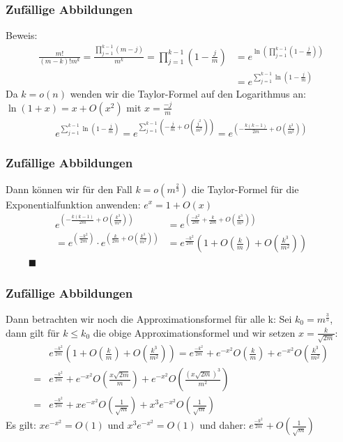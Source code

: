 \documentclass{beamer}
\begin{document}

\begin{frame}
	\frametitle{Zufällige Abbildungen}
	Beweis:
	\begin{align*}
		\frac{m!}{(m-k)!m^k} = \frac{\prod\limits_{j=1}^{k-1}(m-j)}{m^k} = \prod_{j=1}^{k-1} \left(1 - \frac{j}{m}\right)
		&= e^{\ln{\left( \prod_{j=1}^{k-1} \left(1 - \frac{j}{m} \right) \right)}} \\
		&= e^{ \sum_{j=1}^{k-1} \ln{\left(1 - \frac{j}{m} \right)}}
	\end{align*}
	Da \(k=o(n)\) wenden wir die Taylor-Formel auf den Logarithmus an:
	\(\ln{(1+x)} = x + O(x^2)\) mit \(x=\frac{-j}{m}\)
	\begin{align*}
		e^{ \sum_{j=1}^{k-1} \ln{\left(1 - \frac{j}{m} \right)}}
		= e^{\sum_{j=1}^{k-1} \left(-\frac{j}{m} + O\left(\frac{j^2}{m^2}\right)\right)}
		= e^{\left(-\frac{k(k-1)}{2m} + O\left(\frac{k^3}{m^2}\right)\right)}
	\end{align*}
\end{frame}


\begin{frame}
	\frametitle{Zufällige Abbildungen}
	Dann können wir für den Fall \(k=o\left(m^{\frac{2}{3}}\right)\) die Taylor-Formel für die Exponentialfunktion anwenden:
	\(e^x = 1 + O(x) \)
	\begin{align*}
		e^{\left(-\frac{k(k-1)}{2m} + O\left(\frac{k^3}{m^2}\right)\right)}
		&= e^{\left(\frac{-k^2}{2m} + \frac{k}{2m} + O\left(\frac{k^3}{m^2}\right)\right)} \\
		= e^{\left(\frac{-k^2}{2m}\right)} \cdot e^{\left(\frac{k}{2m} + O\left(\frac{k^3}{m^2}\right)\right)}
		&= e^\frac{-k^2}{2m} \left( 1 + O\left(\frac{k}{m}\right) + O\left(\frac{k^3}{m^2}\right) \right)
	\end{align*}
	\(\qquad\) \hfill \(\blacksquare\) \\
\end{frame}


\begin{frame}
	\frametitle{Zufällige Abbildungen}
	Dann betrachten wir noch die Approximationsformel für alle k:
	Sei \(k_0 = m^{\frac{3}{5}} \),
	dann gilt für \(k \leq k_0\) die obige Approximationsformel und wir setzen \(x=\frac{k}{\sqrt{2m}}\):
	\begin{align*}
		&e^\frac{-k^2}{2m} \left( 1 + O\left(\frac{k}{m}\right) + O\left(\frac{k^3}{m^2}\right) \right)
		= e^\frac{-k^2}{2m} + e^{-x^2} O\left(\frac{k}{m}\right) +  e^{-x^2} O\left(\frac{k^3}{m^2}\right) \\
		= &e^\frac{-k^2}{2m} + e^{-x^2} O\left(\frac{x\sqrt{2m}}{m}\right) +  e^{-x^2} O\left(\frac{{\left( x \sqrt{2m}\right)}^3 }{m^2}\right) \\
		= &e^\frac{-k^2}{2m} + xe^{-x^2} O\left(\frac{1}{\sqrt{m}}\right) +  x^3e^{-x^2} O\left(\frac{1}{\sqrt{m}}\right)
	\end{align*}
	Es gilt: \(xe^{-x^2} = O(1)\) und \(x^3e^{-x^2} = O(1)\) und daher:
	\(
		e^\frac{-k^2}{2m} + O\left(\frac{1}{\sqrt{m}}\right)
	\)
\end{frame}
\end{document}
